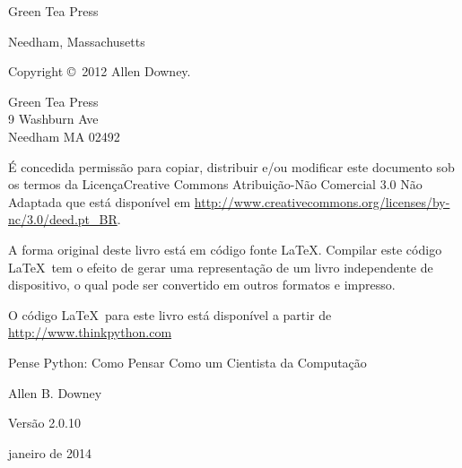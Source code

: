 \documentclass[10pt]{book}
\newcommand{\thetitle}{Pense Python: Como Pensar Como um Cientista da Computação}
\newcommand{\theversion}{2.0.10}
\newcommand{\thedate}{janeiro de 2014}
\begin{document}
\begin{latexonly}
\begin{flushright}
{\Large Green Tea Press}

{\small Needham, Massachusetts}

\vfill

\end{flushright}


\pagebreak
\thispagestyle{empty}

{\small
Copyright \copyright ~2012 Allen Downey.


\vspace{0.2in}

\begin{flushleft}
Green Tea Press       \\
9 Washburn Ave        \\
Needham MA 02492
\end{flushleft}

É concedida permissão para copiar, distribuir e/ou modificar este documento
sob os termos da LicençaCreative Commons Atribuição-Não Comercial 3.0 Não Adaptada
que está disponível em \url{http://www.creativecommons.org/licenses/by-nc/3.0/deed.pt_BR}.

A forma original deste livro está em código fonte \LaTeX. Compilar este
código \LaTeX\ tem o efeito de gerar uma representação de um livro
independente de dispositivo, o qual pode ser convertido em outros formatos
e impresso.

O código \LaTeX\ para este livro está disponível a partir de
\url{http://www.thinkpython.com}

\vspace{0.2in}

} %

\end{latexonly}



\begin{htmlonly}


{\Large \thetitle}

{\large Allen B. Downey}

Versão \theversion

\thedate

\setcounter{chapter}{-1}

\end{htmlonly}

\fi
\end{document}
